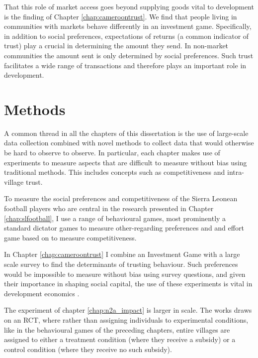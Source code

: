 That this role of market access goes beyond supplying goods vital to development is the finding of Chapter \ref{chap:cameroontrust}. We find that people living in communities with markets behave differently in an investment game. Specifically, in addition to social preferences, expectations of returns (a common indicator of trust) play a crucial in determining the amount they send. In non-market communities the amount sent is only determined by social preferences. 	Such trust facilitates a wide range of transactions and therefore plays an important role in development.

\section{Methods}
A common thread in all the chapters of this dissertation is the use of large-scale data collection combined with novel methods to collect data that would otherwise be hard to observe to observe. In particular, each chapter makes  use of experiments to measure aspects that are difficult to measure without bias using traditional methods. This includes concepts such as competitiveness and intra-village trust.

To measure the social preferences and competitiveness of the Sierra Leonean football players who are central in the research presented in Chapter \ref{chap:slfootball}, I use a range of behavioural games, most prominently a standard dictator games to measure other-regarding preferences and and effort game based on \citet{Niederle2007} to measure competitiveness.  

In Chapter \ref{chap:cameroontrust} I combine an Investment Game \citep{Berg1995} with a large scale survey to find the determinants of trusting behaviour. Such preferences would be impossible to measure without bias using survey questions, and given their importance in shaping social capital, the use of these experiments is vital in development economics \citep[see e.g]{Camerer1995, Cardenas2008a}.

The experiment of chapter \ref{chap:n2a_impact} is larger in scale. The works draws on an RCT, where rather than assigning individuals to experimental conditions, like in the behavioural games of the preceding chapters, entire villages are assigned to either a treatment condition (where they receive a subsidy) or a control condition (where they receive no such subsidy).

